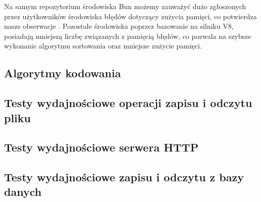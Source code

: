 Na samym repozytorium środowiska Bun możemy zauważyć dużo zgłoszonych przez użytkowników środowiska błędów dotyczący zużycia pamięci, co potwierdza nasze obserwacje \cite{bun_memory}. Pozostałe środowiska poprzez bazowanie na silniku V8, posiadają mniejszą liczbę związanych z pamięcią błędów, co pozwala na szybsze wykonanie algorytmu sortowania oraz mniejsze zużycie pamięci.

\subsection{Algorytmy kodowania}

\subsection{Testy wydajnościowe operacji zapisu i odczytu pliku}

\subsection{Testy wydajnościowe serwera HTTP}

\subsection{Testy wydajnościowe zapisu i odczytu z bazy danych}
